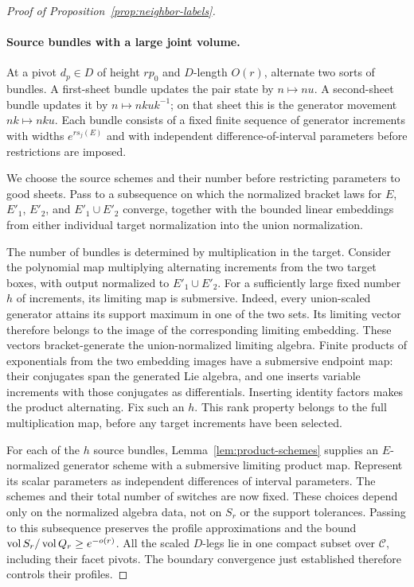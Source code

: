 \begin{proof}[Proof of Proposition~\ref{prop:neighbor-labels}]


\paragraph{Source bundles with a large joint volume.}
At a pivot $d_p\in D$ of height $rp_0$ and $D$-length $O(r)$, alternate
two sorts of bundles.  A first-sheet bundle updates the pair state by
$n\mapsto nu$.  A second-sheet bundle updates it by
$n\mapsto nkuk^{-1}$; on that sheet this is the generator movement
$nk\mapsto nku$.  Each bundle consists of a fixed finite sequence of
generator increments with widths $e^{rs_j(E)}$ and with independent
difference-of-interval parameters before restrictions are imposed.

We choose the source schemes and their number before restricting
parameters to good sheets.  Pass to a subsequence on which the normalized
bracket laws for $E$, $E'_1$, $E'_2$, and $E'_1\cup E'_2$ converge,
together with the bounded linear embeddings from either individual
target normalization into the union normalization.

The number of bundles is determined by multiplication in the target.
Consider the polynomial map multiplying alternating increments from
the two target boxes, with output normalized to $E'_1\cup E'_2$.
For a sufficiently large fixed number $h$ of increments, its limiting
map is submersive.  Indeed, every union-scaled generator attains its
support maximum in one of the two sets.  Its limiting vector therefore
belongs to the image of the corresponding limiting embedding.  These
vectors bracket-generate the union-normalized limiting algebra.
Finite products of exponentials from the two embedding images have
a submersive endpoint map: their conjugates span the generated Lie
algebra, and one inserts variable increments with those conjugates as
differentials.  Inserting identity factors makes the product alternating.
Fix such an $h$.  This rank property belongs to the full multiplication
map, before any target increments have been selected.

For each of the $h$ source bundles,
Lemma~\ref{lem:product-schemes} supplies an $E$-normalized generator
scheme with a submersive limiting product map.  Represent its scalar
parameters as independent differences of interval parameters.  The
schemes and their total number of switches are now fixed.  These
choices depend only on the normalized algebra data, not on $S_r$ or
the support tolerances.  Passing to this subsequence preserves the
profile approximations and the bound $\operatorname{vol} S_r/\operatorname{vol} Q_r\geq e^{-o(r)}$.
All the scaled $D$-legs lie in one compact subset over $\mathcal C$,
including their facet pivots.  The boundary convergence just established
therefore controls their profiles.


\end{proof}
